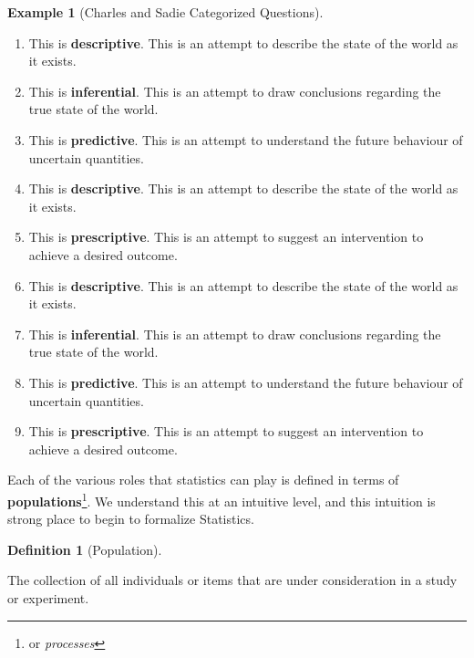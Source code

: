 \documentclass[
  letterpaper,
  DIV=11,
  numbers=noendperiod]{scrreprt}
\providecommand{\tightlist}{%
  \setlength{\itemsep}{0pt}\setlength{\parskip}{0pt}}\usepackage{longtable,booktabs,array}
\theoremstyle{definition}
\theoremstyle{definition}
\newtheorem{example}{Example}[chapter]
\theoremstyle{definition}
\newtheorem{definition}{Definition}[chapter]
\theoremstyle{remark}
\begin{document}
\begin{example}[Charles and Sadie Categorized
Questions]
\begin{tcolorbox}[enhanced jigsaw, colback=white, colframe=quarto-callout-color-frame, arc=.35mm, leftrule=.75mm, rightrule=.15mm, opacityback=0, breakable, bottomrule=.15mm, left=2mm, toprule=.15mm]
\begin{enumerate}
\def\labelenumi{\alph{enumi}.}
\tightlist
\item
  This is \textbf{descriptive}. This is an attempt to describe the state
  of the world as it exists.
\item
  This is \textbf{inferential}. This is an attempt to draw conclusions
  regarding the true state of the world.
\item
  This is \textbf{predictive}. This is an attempt to understand the
  future behaviour of uncertain quantities.
\item
  This is \textbf{descriptive}. This is an attempt to describe the state
  of the world as it exists.
\item
  This is \textbf{prescriptive}. This is an attempt to suggest an
  intervention to achieve a desired outcome.
\item
  This is \textbf{descriptive}. This is an attempt to describe the state
  of the world as it exists.
\item
  This is \textbf{inferential}. This is an attempt to draw conclusions
  regarding the true state of the world.
\item
  This is \textbf{predictive}. This is an attempt to understand the
  future behaviour of uncertain quantities.
\item
  This is \textbf{prescriptive}. This is an attempt to suggest an
  intervention to achieve a desired outcome.
\end{enumerate}

\end{tcolorbox}

\end{example}

Each of the various roles that statistics can play is defined in terms
of \textbf{populations}\footnote{or \emph{processes}}. We understand
this at an intuitive level, and this intuition is strong place to begin
to formalize Statistics.

\begin{definition}[Population]\protect\hypertarget{def-population}{}\label{def-population}

The collection of all individuals or items that are under consideration
in a study or experiment.

\end{definition}
\end{document}
